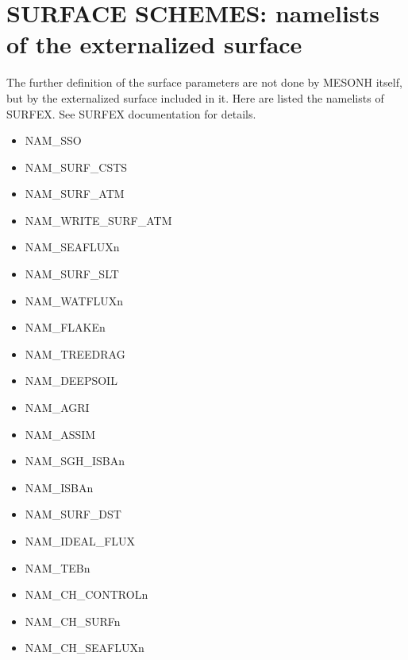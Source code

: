 \section{SURFACE SCHEMES: namelists of the externalized surface}
\label{ss:surf}

The further definition of the surface parameters are not done by MESONH itself, but by the externalized surface included in it. 
Here are listed the namelists of SURFEX. See SURFEX documentation for details.

\begin{itemize}
\item NAM\_SSO
\item NAM\_SURF\_CSTS
\item NAM\_SURF\_ATM
\item NAM\_WRITE\_SURF\_ATM
\item NAM\_SEAFLUXn
\item NAM\_SURF\_SLT
\item NAM\_WATFLUXn
\item NAM\_FLAKEn
\item NAM\_TREEDRAG
\item NAM\_DEEPSOIL
\item NAM\_AGRI
\item NAM\_ASSIM
\item NAM\_SGH\_ISBAn
\item NAM\_ISBAn
\item NAM\_SURF\_DST
\item NAM\_IDEAL\_FLUX
\item NAM\_TEBn
\item NAM\_CH\_CONTROLn
\item NAM\_CH\_SURFn
\item NAM\_CH\_SEAFLUXn

\end{itemize}
